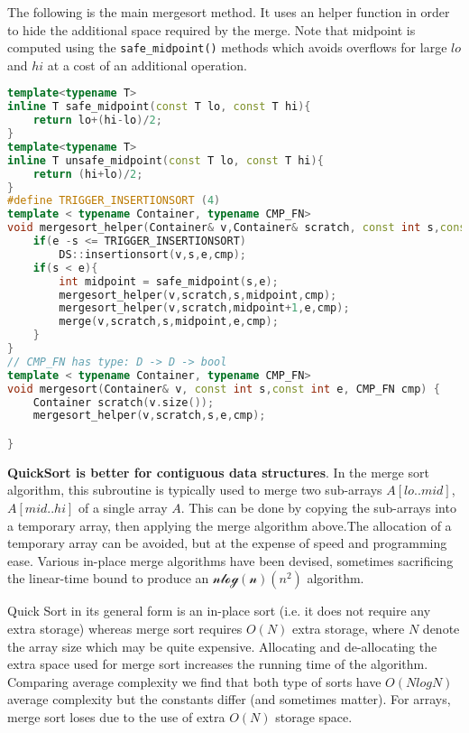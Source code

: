 The following is the main mergesort method. It uses an helper function in order to hide the additional space required by the merge. Note that midpoint is computed using the \texttt{safe\_midpoint()} methods which avoids overflows for large $lo$ and $hi$ at a cost of an additional operation.

\begin{lstlisting}[language=c++, caption="Merge-sort"]
template<typename T>
inline T safe_midpoint(const T lo, const T hi){
    return lo+(hi-lo)/2;
}
template<typename T>
inline T unsafe_midpoint(const T lo, const T hi){
    return (hi+lo)/2;
}
#define TRIGGER_INSERTIONSORT (4)
template < typename Container, typename CMP_FN>
void mergesort_helper(Container& v,Container& scratch, const int s,const int e, CMP_FN cmp) {
    if(e -s <= TRIGGER_INSERTIONSORT)
        DS::insertionsort(v,s,e,cmp);
    if(s < e){
        int midpoint = safe_midpoint(s,e);
        mergesort_helper(v,scratch,s,midpoint,cmp);
        mergesort_helper(v,scratch,midpoint+1,e,cmp);
        merge(v,scratch,s,midpoint,e,cmp);
    }
}
// CMP_FN has type: D -> D -> bool
template < typename Container, typename CMP_FN>
void mergesort(Container& v, const int s,const int e, CMP_FN cmp) {
    Container scratch(v.size());
    mergesort_helper(v,scratch,s,e,cmp);

}
\end{lstlisting}


\textbf{QuickSort is better for contiguous data structures}.
In the merge sort algorithm, this subroutine is typically used to merge two sub-arrays $A[lo..mid]$, $A[mid..hi]$ of a single array $A$. This can be done by copying the sub-arrays into a temporary array, then applying the merge algorithm above.The allocation of a temporary array can be avoided, but at the expense of speed and programming ease. Various in-place merge algorithms have been devised, sometimes sacrificing the linear-time bound to produce an $\mathcal{nlog(n)}(n^2)$ algorithm.

Quick Sort in its general form is an in-place sort (i.e. it does not require any extra storage) whereas merge sort requires $O(N)$ extra storage, where $N$ denote the array size which may be quite expensive. Allocating and de-allocating the extra space used for merge sort increases the running time of the algorithm. Comparing average complexity we find that both type of sorts have $O(NlogN)$ average complexity but the constants differ (and sometimes matter). For arrays, merge sort loses due to the use of extra $O(N)$ storage space.


